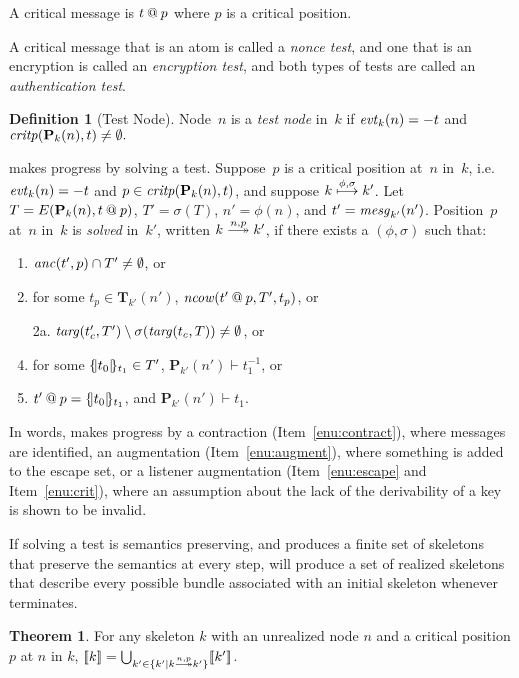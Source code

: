\documentclass[12pt]{article}
\theoremstyle{definition}
\newtheorem{defn}{Definition}[section]
\newtheorem{thm}{Theorem}[section]
\newcommand{\solve}[1]{\stackrel{#1}{\longtwoheadrightarrow}}
\newcommand{\pubmsg}{\mathbf{P}}
\newcommand{\transpred}{\mathbf{T}}
\newcommand{\critpos}{\fn{critp}}
\newcommand{\anc}{\fn{anc}}
\newcommand{\mncow}{\fn{ncow}}
\newcommand{\evt}{\fn{evt}}
\newcommand{\mesg}{\fn{mesg}}
\begin{document}
A critical message is $t \mathbin{@} p$ where $p$ is a critical position.

A critical message that is an atom is called a \emph{nonce test}, and
one that is an encryption is called an \emph{encryption test},  and
both types of tests are called an \emph{authentication test}.

\begin{defn}[Test Node]
Node~$n$ is a \emph{test node} in~$k$ if
$\evt_k(n)=\inbnd t$ and $\critpos(\pubmsg_k(n),t)\neq\emptyset.$
\end{defn}

{\cpsa} makes progress by solving a test.  Suppose~$p$ is a critical
position at~$n$ in~$k$, i.e.\ $\evt_k(n)=\inbnd t$ and
$p\in\critpos(\pubmsg_k(n),t)$, and suppose
$k\stackrel{\phi,\sigma}{\longmapsto}k'$.  Let $T=
E(\pubmsg_k(n),t \termat p)$, $T'=\sigma(T)$, $n'=\phi(n)$, and
$t' = \mesg_{k'}(n')$.  Position~$p$ at~$n$ in~$k$ is
\emph{solved} in~$k'$, written $k\solve{n,p}k'$, if there exists a $(\phi,\sigma)$
such that:
\begin{enumerate}
\item\label{enu:contract} $\anc(t',p) \cap T' \neq \emptyset$, or
\item\label{enu:augment} for some $t_p\in\transpred_{k'}(n')$,
$\mncow(t' \termat p,T',t_p)$, or
\item[2a.]\label{enu:augment2} $\operatorname{\mathit{targ}}(t'_c,T') \setminus
\sigma(\operatorname{\mathit{targ}}(t_c,T)) \neq \emptyset$, or
\item\label{enu:escape} for some $\{\!|t_0|\!\}_{t_1}\in T'$,
$\pubmsg_{k'}(n')\vdash t_1^{-1}$, or
\item\label{enu:crit} $t' \mathbin{@} p=\{\!|t_0|\!\}_{t_1}$, and
$\pubmsg_{k'}(n')\vdash t_1$.
\end{enumerate}

In words, {\cpsa} makes progress by a contraction
(Item~\ref{enu:contract}), where messages are identified, an
augmentation (Item~\ref{enu:augment}), where something is added to the
escape set, or a listener augmentation (Item~\ref{enu:escape} and
Item~\ref{enu:crit}), where an assumption about the lack of the
derivability of a key is shown to be invalid.

If solving a test is semantics preserving, and {\cpsa} produces a
finite set of skeletons that preserve the semantics at every step,
{\cpsa} will produce a set of realized skeletons that describe every
possible bundle associated with an initial skeleton whenever {\cpsa}
terminates.

\begin{thm}
For any skeleton $k$ with an unrealized node $n$ and a critical position
$p$ at $n$ in $k$,
$\sembrack{k}=\bigcup_{k'\in\{k'\mid k\solve{n,p}k'\}}\sembrack{k'}$.
\end{thm}
\end{document}

